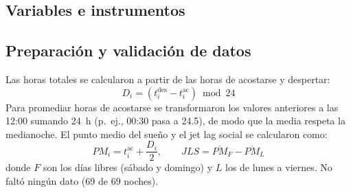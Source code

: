 \documentclass[conference]{IEEEtran}
\begin{document}
\subsection{Variables e instrumentos}
\begin{table}[ht]
\centering
\caption{Estadística descriptiva ($n=69$ noches). Las horas de acostarse y despertar se expresan en formato de 24 horas.}
\label{tab:descriptiva}
\end{table}

\subsection{Preparación y validación de datos}
Las horas totales se calcularon a partir de las horas de acostarse y despertar:
\begin{equation}
D_i = (t_i^{\text{des}} - t_i^{\text{ac}}) \bmod 24
\end{equation}
Para promediar horas de acostarse se transformaron los valores anteriores a las 12:00 sumando 24~h (p.~ej., 00:30 pasa a 24.5), de modo que la media respeta la medianoche. El punto medio del sueño y el jet lag social se calcularon como:
\begin{equation}
PM_i = t_i^{\text{ac}} + \frac{D_i}{2}, \qquad JLS = \overline{PM}_F - \overline{PM}_L
\end{equation}
donde $F$ son los días libres (sábado y domingo) y $L$ los de lunes a viernes. No faltó ningún dato (69 de 69 noches).
\end{document}
